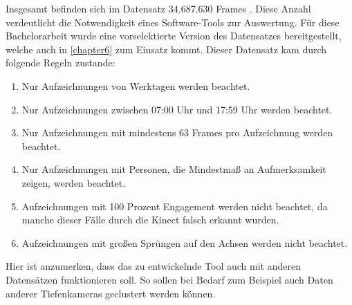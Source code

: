 Insgesamt befinden sich im Datensatz 34.687.630 Frames \citep{temiz_konzeption_2022}.
Diese Anzahl verdeutlicht die Notwendigkeit eines Software-Tools zur Auswertung.
Für diese Bachelorarbeit wurde eine vorselektierte Version des Datensatzes bereitgestellt,
welche auch in \autoref{chapter6} zum Einsatz kommt.
Dieser Datensatz kam durch folgende Regeln zustande:
\begin{enumerate}
  \item Nur Aufzeichnungen von Werktagen werden beachtet.
  \item Nur Aufzeichnungen zwischen 07:00 Uhr und 17:59 Uhr werden beachtet.
  \item Nur Aufzeichnungen mit mindestens 63 Frames pro Aufzeichnung werden beachtet.
  \item Nur Aufzeichnungen mit Personen, die Mindestmaß an Aufmerksamkeit zeigen, werden beachtet.
  \item Aufzeichnungen mit 100 Prozent Engagement werden nicht beachtet, da manche dieser Fälle durch die Kinect falsch erkannt wurden.
  \item Aufzeichnungen mit großen Sprüngen auf den Achsen werden nicht beachtet.
\end{enumerate}
Hier ist anzumerken, dass das zu entwickelnde Tool auch mit anderen Datensätzen funktionieren soll.
So sollen bei Bedarf zum Beispiel auch Daten anderer Tiefenkameras geclustert werden können.

